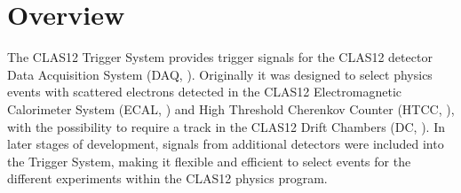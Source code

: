 \section{Overview}

The CLAS12 Trigger System provides trigger signals for the CLAS12 detector Data Acquisition System (DAQ, \cite{daq-ref}). Originally it was designed to select physics events with scattered electrons detected in the CLAS12 Electromagnetic Calorimeter System (ECAL, \cite{ec-ref}) and High Threshold Cherenkov Counter (HTCC, \cite{htcc-ref}), with the possibility to require a track in the CLAS12 Drift Chambers (DC, \cite{dc-ref}). In later stages of development, signals from additional detectors were included into the Trigger System, making it flexible and efficient to select events for the different experiments within the CLAS12 physics program.




